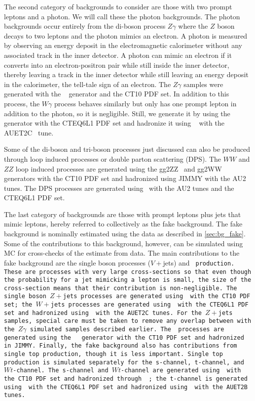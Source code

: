 The second category of backgrounds to consider are those with two 
prompt leptons and a photon. We will call these the photon backgrounds.
The photon backgrounds occur entirely from the di-boson process $Z\gamma$
where the $Z$ boson decays to two leptons and the photon mimics an electron.
A photon is measured
by observing an energy deposit in the electromagnetic calorimeter 
without any associated track in the inner detector.
A photon can mimic an electron
if it converts into an electron-positron
pair while still inside the inner detector, thereby leaving a track 
in the inner detector while still leaving an energy deposit in the 
calorimeter, the tell-tale sign of an electron.
The $Z\gamma$ samples were generated with the \sherpa~\cite{sherpa} generator 
and the CT10 PDF set.  %
In addition to this process, the $W\gamma$ process behaves similarly 
but only has one prompt lepton in addition to the photon, so it is negligible.
Still, we generate it by using
the \alpgen~\cite{ALPGEN} generator with the CTEQ6L1 PDF set
and hadronize it using \jimmy~\cite{Jimmy} with the AUET2C~\cite{ATL-PHYS-PUB-2011-009} 
tune.

Some of the di-boson and tri-boson processes just discussed can also be produced
through loop induced processes or double parton scattering (DPS).
The $WW$ and $ZZ$
loop induced processes are generated using the gg2ZZ~\cite{Binoth:2008pr} 
and gg2WW~\cite{Binoth:2006mf} generators with the CT10 PDF set and
hadronized using JIMMY with the AU2 tunes.
The DPS
processes are generated using \pythiaeight~with the AU2 
tunes and the CTEQ6L1 PDF set. 

The last category of backgrounds are those with prompt leptons plus
jets that mimic leptons, hereby 
referred to collectively as the fake background. 
The fake background is nominally estimated using the data
as described in \sec\ref{sec:bg_fake}. Some of the contributions
to this background, however, can be simulated using MC 
for cross-checks of 
the estimate from data. The main contributions
to the fake background
are the single boson processes ($V+$jets) and \tt~production.
These are processes with very large cross-sections so
that even though the probability for a jet mimicking a lepton is small,
the size of the cross-section means that their contribution is non-negligible.
The single boson $Z+$jets processes are generated using \sherpa~with the CT10
PDF set; the $W+$jets processes are generated using \alpgen~with
the CTEQ6L1 PDF set and hadronized using \jimmy~with the AUET2C tunes.
For the $Z+$jets samples, special care must be taken to remove any overlap 
between with the $Z\gamma$ simulated samples described earlier.
The \tt~processes are generated using the \mcatnlo~\cite{MCatNLO}
generator with the CT10 PDF set and hadronized in JIMMY.  %
Finally, the fake background also has contributions from single top production,
though it is less important. Single top production is simulated separately 
for the s-channel, t-channel, and $Wt$-channel. The s-channel 
and $Wt$-channel are generated using \mcatnlo~with the CT10 PDF set and 
hadronized through \jimmy~; the t-channel is generated using 
\madgraph~with the CTEQ6L1 PDF set and hadronized 
using \pythiasix~with the AUET2B tunes.

